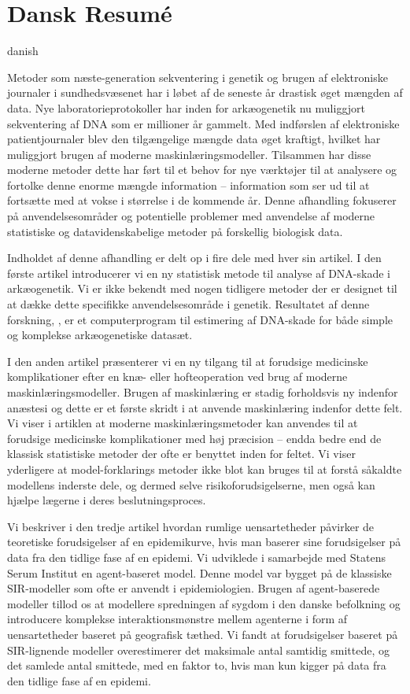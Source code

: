 \chapter{Dansk Resumé}

\begin{otherlanguage*}{danish}


    Metoder som næste-generation sekventering i genetik og brugen af elektroniske journaler i sundhedsvæsenet har i løbet af de seneste år drastisk øget mængden af data. Nye laboratorieprotokoller har inden for arkæogenetik nu muliggjort sekventering af DNA som er millioner år gammelt. Med indførslen af elektroniske patientjournaler blev den tilgængelige mængde data øget kraftigt, hvilket har muliggjort brugen af moderne maskinlæringsmodeller. Tilsammen har disse moderne metoder dette har ført til et behov for nye værktøjer til at analysere og fortolke denne enorme mængde information -- information som ser ud til at fortsætte med at vokse i størrelse i de kommende år. Denne afhandling fokuserer på anvendelsesområder og potentielle problemer med anvendelse af moderne statistiske og datavidenskabelige metoder på forskellig biologisk data.

    Indholdet af denne afhandling er delt op i fire dele med hver sin artikel. I den første artikel introducerer vi en ny statistisk metode til analyse af DNA-skade i arkæogenetik. Vi er ikke bekendt med nogen tidligere metoder der er designet til at dække dette specifikke anvendelsesområde i genetik. Resultatet af denne forskning, \metaDMG, er et computerprogram til estimering af DNA-skade for både simple og komplekse arkæogenetiske datasæt.

    I den anden artikel præsenterer vi en ny tilgang til at forudsige medicinske komplikationer efter en knæ- eller hofteoperation ved brug af moderne maskinlæringsmodeller. Brugen af maskinlæring er stadig forholdsvis ny indenfor anæstesi og dette er et første skridt i at anvende maskinlæring indenfor dette felt. Vi viser i artiklen at moderne maskinlæringsmetoder kan anvendes til at forudsige medicinske komplikationer med høj præcision -- endda bedre end de klassisk statistiske metoder der ofte er benyttet inden for feltet. Vi viser yderligere at model-forklarings metoder ikke blot kan bruges til at forstå såkaldte modellens inderste dele, og dermed selve risikoforudsigelserne, men også kan hjælpe lægerne i deres beslutningsproces.

    Vi beskriver i den tredje artikel hvordan rumlige uensartetheder påvirker de teoretiske forudsigelser af en epidemikurve, hvis man baserer sine forudsigelser på data fra den tidlige fase af en epidemi. Vi udviklede i samarbejde med Statens Serum Institut en agent-baseret model. Denne model var bygget på de klassiske SIR-modeller som ofte er anvendt i epidemiologien. Brugen af agent-baserede modeller tillod os at modellere spredningen af sygdom i den danske befolkning og introducere komplekse interaktionsmønstre mellem agenterne i form af uensartetheder baseret på geografisk tæthed. Vi fandt at forudsigelser baseret på SIR-lignende modeller overestimerer det maksimale antal samtidig smittede, og det samlede antal smittede, med en faktor to, hvis man kun kigger på data fra den tidlige fase af en epidemi.


\end{otherlanguage*}
